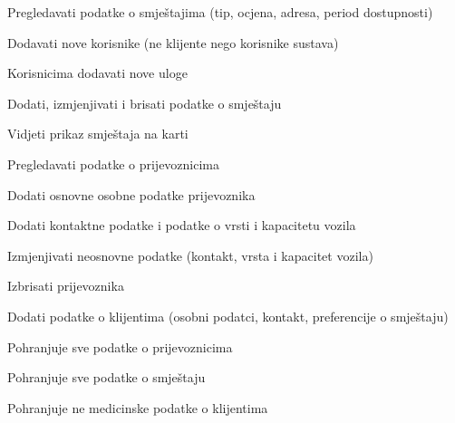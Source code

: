 			
			\begin{packed_enum}
				\item  {}
				
				\begin{packed_enum}
					
					\item Pregledavati podatke o smještajima (tip, ocjena, adresa, period dostupnosti)
					\item Dodavati nove korisnike (ne klijente nego korisnike sustava)
					\item Korisnicima dodavati nove uloge
					\item Dodati, izmjenjivati i brisati podatke o smještaju
					\item Vidjeti prikaz smještaja na karti
					
				\end{packed_enum}
				\eject
				
					\item  {}
				
				\begin{packed_enum}
					
					\item Pregledavati podatke o prijevoznicima
					\item Dodati osnovne osobne podatke prijevoznika
					\item Dodati kontaktne podatke i podatke o vrsti i kapacitetu vozila
					\item Izmjenjivati neosnovne podatke (kontakt, vrsta i kapacitet vozila)
					\item Izbrisati prijevoznika

				\end{packed_enum}
				
					\item  {}
				
				\begin{packed_enum}
					
					\item Dodati podatke o klijentima (osobni podatci, kontakt, preferencije o smještaju)
					
				\end{packed_enum}
			
				\item  {}
				
				\begin{packed_enum}
					
					\item Pohranjuje sve podatke o prijevoznicima
					\item Pohranjuje sve podatke o smještaju
					\item Pohranjuje ne medicinske podatke o klijentima
					
				\end{packed_enum}
				
					
			\end{packed_enum}
			
